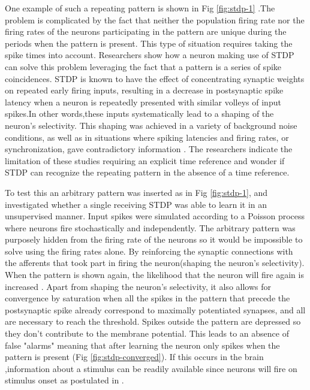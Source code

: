 \documentclass[12pt]{report}
\begin{document}
One example of such a repeating pattern is shown in Fig \ref{fig:stdp-1} .The problem is complicated by the fact that neither the population firing rate nor the firing rates of the neurons participating in the pattern are unique during the periods when the pattern is present. This type of situation requires taking the spike times into account. Researchers show how a neuron making use of STDP can solve this problem leveraging the fact that a pattern is a series of spike coincidences. STDP is known to have the effect of concentrating synaptic weights on repeated early firing inputs, resulting in a decrease in postsynaptic spike latency when a neuron is repeatedly presented with similar volleys of input spikes.In other words,these inputs systematically lead to a shaping of the neuron's selectivity. This shaping was achieved in a variety of background noise conditions, as well as in situations where spiking latencies and firing rates, or synchronization, gave contradictory information \cite{rossum2000} \cite{guyonneau2005} \cite{masquelier2007} . The researchers indicate the limitation of these studies requiring an explicit time reference and wonder if STDP can recognize the repeating pattern in the absence of a time reference.

To test this an arbitrary pattern was inserted as in Fig \ref{fig:stdp-1}, and investigated whether a single receiving STDP was able to learn it in an unsupervised manner. Input spikes were simulated according to a Poisson process where neurons fire stochastically and independently. The arbitrary pattern was purposely hidden from the firing rate of the neurons so it would be impossible to solve using the firing rates alone. By reinforcing the synaptic connections with the afferents that took part in firing the neuron(shaping the neuron's selectivity). When the pattern is shown again, the likelihood that the neuron will fire again is increased . Apart from shaping the neuron's selectivity, it also allows for convergence by saturation when all the spikes in the pattern that precede the postsynaptic spike already correspond to maximally potentiated synapses, and all are necessary to reach the threshold. Spikes outside the pattern are depressed so they don't contribute to the membrane potential. This leads to an absence of false "alarms" meaning that after learning the neuron only spikes when the pattern is present (Fig \ref{fig:stdp-converged}). If this occurs in the brain ,information about a stimulus can be readily available since neurons will fire on stimulus onset as postulated in \cite{thorpe2001}. 
\end{document}
